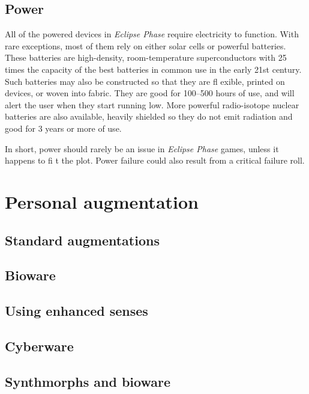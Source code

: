 \subsection{Power}
\label{sec:power}

All of the powered devices in \emph{Eclipse Phase} require
electricity to function. With rare exceptions, most of
them rely on either solar cells or powerful batteries.
These batteries are high-density, room-temperature
superconductors with 25 times the capacity of the
best batteries in common use in the early 21st century.
Such batteries may also be constructed so that they
are fl exible, printed on devices, or woven into fabric.
They are good for 100–500 hours of use, and will alert
the user when they start running low. More powerful
radio-isotope nuclear batteries are also available,
heavily shielded so they do not emit radiation and
good for 3 years or more of use.

In short, power should rarely be an issue in \emph{Eclipse
Phase} games, unless it happens to fi t the plot. Power
failure could also result from a critical failure roll.


\section{Personal augmentation}
\label{sec:personal-augmentation}

\subsection{Standard augmentations}
\label{sec:std-augmentations}

\subsection{Bioware}
\label{sec:bioware}

\subsection{Using enhanced senses}
\label{sec:using-enhanced-senses}

\subsection{Cyberware}
\label{sec:cyberware}

\subsection{Synthmorphs and bioware}
\label{sec:synthmorphs-bioware}

